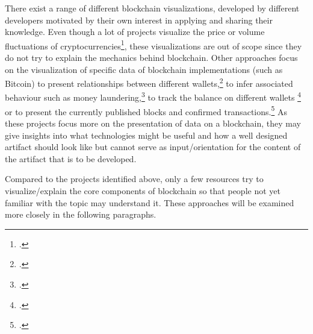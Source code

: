 There exist a range of different blockchain visualizations, developed by different developers motivated by their own interest in applying and sharing their knowledge. Even though a lot of projects visualize the price or volume fluctuations of cryptocurrencies\footcites[Cf.][]{SapekCryptowatchliveBitcoin2014}[cf.][]{CryptoMapsCryptocurrencyMarket}, these visualizations are out of scope since they do not try to explain the mechanics behind blockchain. Other approaches focus on the visualization of specific data of blockchain implementations (such as Bitcoin) to present relationships between different wallets,\footcites[Cf.][]{Reidanalysisanonymitybitcoin2013}[cf.][]{BaumannExploringBitcoinnetwork2014}[cf.][]{Interaqt2016}[cf.][]{McGinnVisualizingDynamicBitcoin2016}[cf.][]{McGinnOpenDataBlockchain2018} to infer associated behaviour such as money laundering,\footcites[Cf.][]{Meiklejohnfistfulbitcoinscharacterizing2013}[cf.][]{EllipticEnterprisesLimitedEllipticBitcoinBig} to track the balance on different wallets \footcites[Cf.][]{EtherScanEthereumBlock}[cf.][]{BlcokchainLuxembourgS.A.R.L.BlockchaininfoBitcoin} or to present the currently published blocks and confirmed transactions.\footcites[Cf.][]{BattistaBitconeviewvisualizationflows2015}[cf.][]{BitcoinCityinfoRoad}[cf.][]{Bitbonkers2016}[cf.][]{BlockSeer2015}[cf.][]{DailyBlockchainBlockchain2013}[cf][]{YeowBitcoinNodesGlobal2018}[cf.][]{LaumeisterBitListenBitcoinTransaction2015}[cf.][]{MillerBitcoinVisualizer2015}[cf.][]{VisualizingBitcoinTransactions2015}[cf.][]{Blockchain3DExplorer2017} As these projects focus more on the presentation of data on a blockchain, they may give insights into what technologies might be useful and how a well designed artifact should look like but cannot serve as input/orientation for the content of the artifact that is to be developed. 

Compared to the projects identified above, only a few resources try to visualize/explain the core components of blockchain so that people not yet familiar with the topic may understand it. These approaches will be examined more closely in the following paragraphs. 

